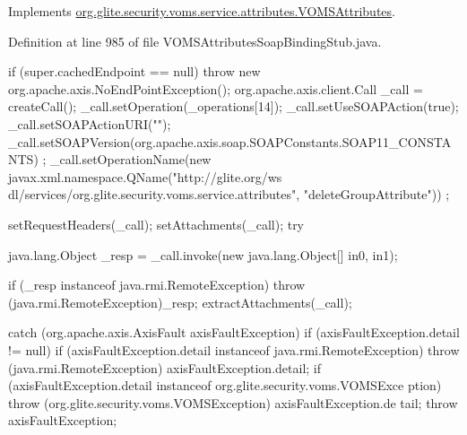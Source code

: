 Implements \hyperlink{interfaceorg_1_1glite_1_1security_1_1voms_1_1service_1_1attributes_1_1VOMSAttributes_a5564060b855e3a2eeb79ce98b5d74e4c}{org.glite.security.voms.service.attributes.VOMSAttributes}.



Definition at line 985 of file VOMSAttributesSoapBindingStub.java.


\begin{DoxyCode}
                                                                                 
                                                                                       
                                     {
        if (super.cachedEndpoint == null) {
            throw new org.apache.axis.NoEndPointException();
        }
        org.apache.axis.client.Call _call = createCall();
        _call.setOperation(_operations[14]);
        _call.setUseSOAPAction(true);
        _call.setSOAPActionURI("");
        _call.setSOAPVersion(org.apache.axis.soap.SOAPConstants.SOAP11_CONSTANTS)
      ;
        _call.setOperationName(new javax.xml.namespace.QName("http://glite.org/ws
      dl/services/org.glite.security.voms.service.attributes", "deleteGroupAttribute"))
      ;

        setRequestHeaders(_call);
        setAttachments(_call);
 try {        java.lang.Object _resp = _call.invoke(new java.lang.Object[] {in0, 
      in1});

        if (_resp instanceof java.rmi.RemoteException) {
            throw (java.rmi.RemoteException)_resp;
        }
        extractAttachments(_call);
  } catch (org.apache.axis.AxisFault axisFaultException) {
    if (axisFaultException.detail != null) {
        if (axisFaultException.detail instanceof java.rmi.RemoteException) {
              throw (java.rmi.RemoteException) axisFaultException.detail;
         }
        if (axisFaultException.detail instanceof org.glite.security.voms.VOMSExce
      ption) {
              throw (org.glite.security.voms.VOMSException) axisFaultException.de
      tail;
         }
   }
  throw axisFaultException;
}
    }
\end{DoxyCode}
